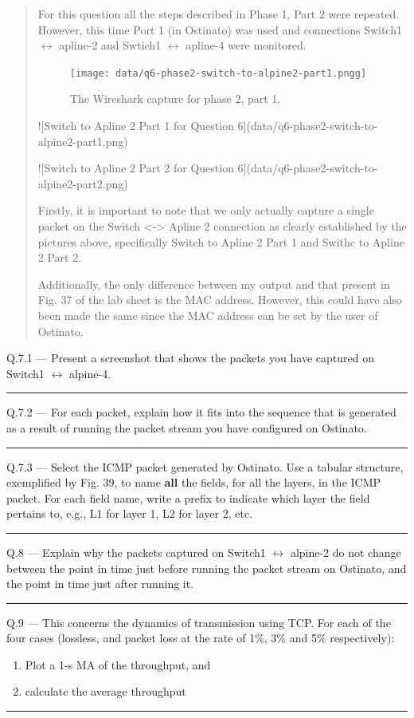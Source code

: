 \documentclass{article}
\newcommand\Que[2]{%
   \begin{samepage}
   \leavevmode\par
   \noindent
   Q.#1 --- #2\par\vspace{10pt}\hrule\vspace{10pt}
   \end{samepage}}
\newenvironment{ans}
   {\fbox{Answer}\begin{quote}\nopagebreak}
   {\end{quote}}
\begin{document}
\begin{ans}
	For this question all the steps described in
	Phase 1, Part 2 were repeated. However, this time Port 1
	(in Ostinato) was used and connections Switch1 $\leftrightarrow$
	apline-2 and Swtich1 $\leftrightarrow$ apline-4 were monitored.
	
	\begin{figure}[H]
		\centering
		\texttt{[image: data/q6-phase2-switch-to-alpine2-part1.pngg]}
		\caption{The Wireshark capture for phase 2, part 1.}
		\label{fig:wireshark-capture4-q5}
	\end{figure}
	
	![Switch to Apline 2 Part 1 for Question 6](data/q6-phase2-switch-to-alpine2-part1.png)
	
	![Switch to Apline 2 Part 2 for Question 6](data/q6-phase2-switch-to-alpine2-part2.png)
	
	Firstly, it is important to note that we only actually capture a
	single packet on the Switch <-> Apline 2 connection as clearly
	established by the pictures above, specifically Switch to Apline
	2 Part 1 and Swithc to Apline 2 Part 2.
	
	Additionally, the only difference between my output and that
	present in Fig. 37 of the lab sheet is the MAC address. However,
	this could have also been made the same since the MAC address
	can be set by the user of Ostinato.
\end{ans}


\Que{7.1}{Present a screenshot that shows the packets you have
captured on Switch1 $\leftrightarrow$ alpine-4.}


\Que{7.2}{For each packet, explain how it fits into the sequence that is generated as a result of running the
packet stream you have configured on Ostinato.}

\Que{7.3}{Select the ICMP packet generated by Ostinato. Use a
   tabular structure, exemplified by Fig. 39, to name
   \textbf{all} the fields, for all the layers, in the ICMP
   packet. For each field name, write a prefix to indicate which
layer the field pertains to, e.g., L1 for layer 1, L2 for layer
2, etc.}

\Que{8}{Explain why the packets captured on Switch1
   $\leftrightarrow$ alpine-2 do not change between the point in
   time just before running the packet stream on Ostinato, and
   the point in time just after
running it.}

\Que{9}{
This concerns the dynamics of transmission using TCP. For each
of the four cases (lossless, and packet loss at the rate of 1\%,
3\% and 5\% respectively):
\begin{enumerate}
\item Plot a 1-s MA of the throughput, and
\item calculate the average throughput
\end{enumerate}}
\end{document}
